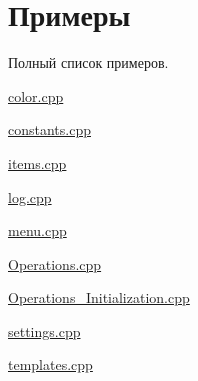 \section{Примеры}
Полный список примеров.\begin{DoxyCompactItemize}
\item 
\hyperlink{color_8cpp-example}{color.\+cpp}
\item 
\hyperlink{constants_8cpp-example}{constants.\+cpp}
\item 
\hyperlink{items_8cpp-example}{items.\+cpp}
\item 
\hyperlink{log_8cpp-example}{log.\+cpp}
\item 
\hyperlink{menu_8cpp-example}{menu.\+cpp}
\item 
\hyperlink{_operations_8cpp-example}{Operations.\+cpp}
\item 
\hyperlink{_operations__initialization_8cpp-example}{Operations\+\_\+\+Initialization.\+cpp}
\item 
\hyperlink{settings_8cpp-example}{settings.\+cpp}
\item 
\hyperlink{templates_8cpp-example}{templates.\+cpp}
\end{DoxyCompactItemize}
